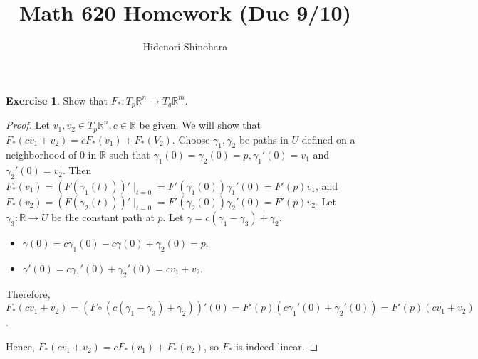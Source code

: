 \documentclass[12pt, psamsfonts]{amsart}
\theoremstyle{definition}
\newtheorem*{exer}{Exercise}
\theoremstyle{remark}
\numberwithin{equation}{section}
\begin{document}
\title{Math 620 Homework (Due 9/10)}
\author{Hidenori Shinohara}
\maketitle

\begin{exer}
  Show that $F_*: T_p\mathbb{R}^n \rightarrow T_q\mathbb{R}^m$.
\end{exer}

\begin{proof}
  Let $v_1, v_2 \in T_p\mathbb{R}^n, c \in \mathbb{R}$ be given.
  We will show that $F_*(cv_1 + v_2) = cF_*(v_1) + F_*(V_2)$.
  Choose $\gamma_1, \gamma_2$ be paths in $U$ defined on a neighborhood of $0$ in $\mathbb{R}$ such that $\gamma_1(0) = \gamma_2(0) = p, \gamma_1'(0) = v_1$ and $\gamma_2'(0) = v_2$.
  Then $F_*(v_1) = (F(\gamma_1(t)))'\mid_{t = 0} = F'(\gamma_1(0))\gamma_1'(0) = F'(p)v_1$, and $F_*(v_2) = (F(\gamma_2(t)))'\mid_{t = 0} = F'(\gamma_2(0))\gamma_2'(0) = F'(p)v_2$.
  Let $\gamma_3: \mathbb{R} \rightarrow U$ be the constant path at $p$.
  Let $\gamma = c(\gamma_1 - \gamma_3) + \gamma_2$.
  \begin{itemize}
    \item
      $\gamma(0) = c\gamma_1(0) - c\gamma(0) + \gamma_2(0) = p$.
    \item
      $\gamma'(0) = c\gamma_1'(0) + \gamma_2'(0) = cv_1 + v_2$.
  \end{itemize}
  Therefore, $F_*(cv_1 + v_2) = (F \circ (c(\gamma_1 - \gamma_3) + \gamma_2))'(0) = F'(p)(c\gamma_1'(0) + \gamma_2'(0)) = F'(p)(cv_1 + v_2)$.

  Hence, $F_*(cv_1 + v_2) = cF_*(v_1) + F_*(v_2)$, so $F_*$ is indeed linear.
\end{proof}
\end{document}
